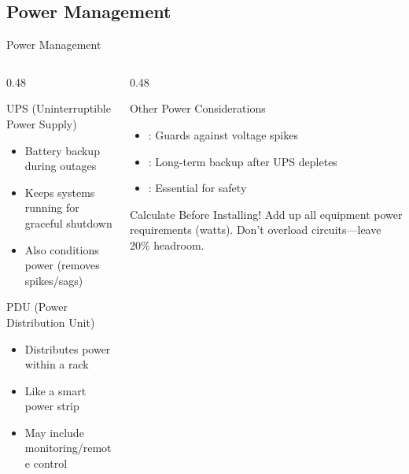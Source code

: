 \documentclass[aspectratio=169]{beamer}  %
\begin{document}
\subsection{Power Management}

\begin{frame}{Power Management}
    \begin{columns}[T]
        \begin{column}{0.48\textwidth}
            \begin{block}{UPS (Uninterruptible Power Supply)}
                \begin{itemize}
                    \item Battery backup during outages
                    \item Keeps systems running for graceful shutdown
                    \item Also conditions power (removes spikes/sags)
                \end{itemize}
            \end{block}
            
            \vspace{0.3em}
            \begin{block}{PDU (Power Distribution Unit)}
                \begin{itemize}
                    \item Distributes power within a rack
                    \item Like a smart power strip
                    \item May include monitoring/remote control
                \end{itemize}
            \end{block}
        \end{column}
        \begin{column}{0.48\textwidth}
            \begin{block}{Other Power Considerations}
                \begin{itemize}
                    \item {}: Guards against voltage spikes
                    \item {}: Long-term backup after UPS depletes
                    \item {}: Essential for safety
                \end{itemize}
            \end{block}
            
            \vspace{0.3em}
            \begin{alertblock}{Calculate Before Installing!}
                Add up all equipment power requirements (watts). Don't overload circuits---leave 20\% headroom.
            \end{alertblock}
        \end{column}
    \end{columns}
\end{frame}
\end{document}
